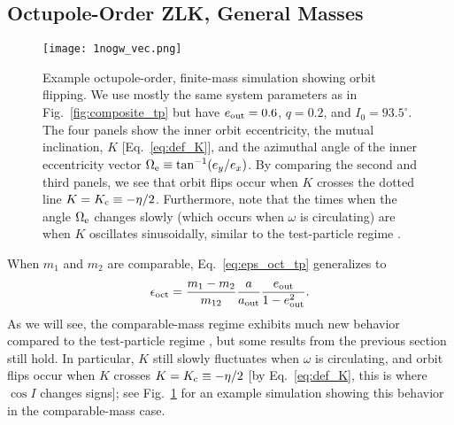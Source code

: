 \documentclass[
        fleqn,
        usenatbib,
    ]{mnras}
\newlength{\colummwidth}
\begin{document}
\subsection{Octupole-Order ZLK, General Masses}\label{ss:oct_gen}

\begin{figure}
    \centering
    \texttt{[image: 1nogw\_vec.png]}
    \caption{Example octupole-order, finite-mass simulation showing orbit
    flipping. We use mostly the same system parameters as in
    Fig.~\ref{fig:composite_tp} but have $e_{\rm out} = 0.6$, $q = 0.2$, and
    $I_0 = 93.5^\circ$. The four panels show the inner orbit eccentricity, the
    mutual inclination, $K$ [Eq.~\eqref{eq:def_K}], and the azimuthal angle of
    the inner eccentricity vector $\Omega_{\rm e} \equiv \tan^{-1}(e_y / e_x)$.
    By comparing the second and third panels, we see that orbit flips occur when
    $K$ crosses the dotted line $K = K_{\rm c} \equiv -\eta / 2$. Furthermore,
    note that the times when the angle $\Omega_{\rm e}$ changes slowly (which
    occurs when $\omega$ is circulating) are when $K$ oscillates sinusoidally,
    similar to the test-particle regime \citep{katz2011long}.
    }\label{fig:nogw_fiducial}
\end{figure}
When $m_1$ and $m_2$ are comparable, Eq.~\eqref{eq:eps_oct_tp} generalizes to
\citep{LML15, anderson2016formation, ll18}
\begin{equation}
    \epsilon_{\rm oct} = \frac{m_1 - m_2}{m_{12}} \frac{a}{a_{\rm out}}
        \frac{e_{\rm out}}{1 - e_{\rm out}^2}.\label{eq:eps_oct}
\end{equation}
As we will see, the comparable-mass regime exhibits much new behavior compared
to the test-particle regime \citep[see also][]{rodet_inprep}, but some results
from the previous section still hold. In particular, $K$ still slowly fluctuates
when $\omega$ is circulating, and orbit flips occur when $K$ crosses $K = K_{\rm
c} \equiv -\eta / 2$ [by Eq.~\eqref{eq:def_K}, this is where $\cos I$ changes
signs]; see Fig.~\ref{fig:nogw_fiducial} for an example simulation showing this
behavior in the comparable-mass case.
\end{document}
